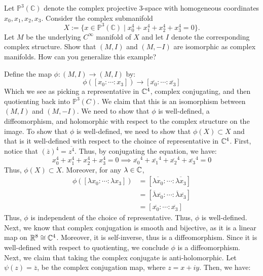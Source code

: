\documentclass[12pt]{article}
\begin{document}
\begin{problab}{5}
Let $\mathbb{P}^3(\mathbb{C})$ denote the complex projective 3-space with homogeneous coordinates $x_0, x_1, x_2, x_3$. Consider the complex submanifold
\[
X := \{x \in \mathbb{P}^3(\mathbb{C}) \mid x_0^4 + x_1^4 + x_2^4 + x_3^4 = 0\}.
\]
Let $M$ be the underlying $C^\infty$ manifold of $X$ and let $I$ denote the corresponding complex structure. Show that $(M, I)$ and $(M, -I)$ are isomorphic as complex manifolds. How can you generalize this example?
\end{problab}
\begin{solu}
    \bbni
    Define the map $\phi: (M, I) \to (M, I)$ by: 
    \[ \phi([x_0 : \cdots : x_3 ]) \to [\overline{x_0} : \cdots : \overline{x_3}]\]
    Which we see as picking a representative in $\mathbb C^4$, complex conjugating, and then quotienting back into $\mathbb{P}^3(C)$. We claim that this is an isomorphism between $(M, I)$ and $(M, -I)$. We need to show that $\phi$ is well-defined, a diffeomorphism, and holomorphic with respect to the complex structure on the image. \bbni
    To show that $\phi$ is well-defined, we need to show that $\phi(X) \subset X$ and that is it well-defined with respect to the choince of representative in $\mathbb C^4$. First, notice that $(\overline{z})^4 = \overline{z^4}$. Thus, by conjugating the equation, we have:
    \[ x_0^4 + x_1^4 + x_2^4 + x_3^4 = 0 \implies \overline{x_0}^4 + \overline{x_1}^4 + \overline{x_2}^4 + \overline{x_3}^4 = 0  \]
    Thus, $\phi(X) \subset X$. Moreover, for any $\lambda \in \mathbb C$, 
    \begin{align*}
        \phi([\lambda x_0 : \cdots : \lambda x_3]) &= [\overline{\lambda x_0}: \cdots : \overline{\lambda x_3}] \\
        &= [\overline{\lambda}\overline{x_0}: \cdots : \overline{\lambda} \overline{x_3}] \\
        &= [\overline{x_0}: \cdots : \overline{x_3}]
    \end{align*}
    Thus, $\phi$ is independent of the choice of representative. Thus, $\phi$ is well-defined. \bbni
    Next, we know that complex conjugation is smooth and bijective, as it is a linear map on $\mathbb R^8 \cong \mathbb C^4$. Moreover, it is self-inverse, thus is a diffeomorphism. Since it is well-defined with respect to quotienting, we conclude $\phi$ is a diffeomorphism. \bbni
    Next, we claim that taking the complex conjugate is anti-holomorphic. Let $\psi(z) = \overline{z}$, be the complex conjugation map, where $z = x + iy$. Then, we have:

\end{solu}
\end{document}

